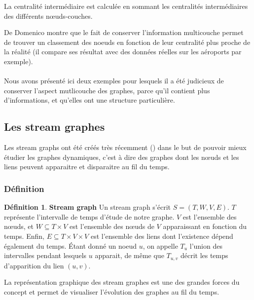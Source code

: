 \documentclass[11pt,a4paper]{article}
\theoremstyle{definition}
\newtheorem{defn}{Définition}
\theoremstyle{remark}
\theoremstyle{remark}
\begin{document}
La centralité intermédiaire est calculée en sommant les centralités intermédiaires des différents nœuds-couches.

De Domenico montre que le fait de conserver l'information multicouche permet de trouver un classement des noeuds en fonction de leur centralité plus proche de la réalité (il compare ses résultat avec des données réelles sur les aéroports par exemple).

\paragraph{}

Nous avons présenté ici deux exemples pour lesquels il a été judicieux de conserver l'aspect mutlicouche des graphes, parce qu'il contient plus d'informations, et qu'elles ont une structure particulière.


\subsection{Les stream graphes}



Les stream graphs ont été créés très récemment (\cite{stream}) dans le but de pouvoir mieux étudier les graphes dynamiques, c'est à dire des graphes dont les nœuds et les liens peuvent apparaitre et disparaitre au fil du temps.

\subsubsection{Définition}

\begin{defn}{\textbf{Stream graph}}
Un stream graph s'écrit $S=(T,W,V,E)$. $T$ représente l'intervalle de temps d'étude de notre graphe. $V$ est l'ensemble des nœuds, et $W \subseteq T \times V$ est l'ensemble des nœuds de $V$ apparaissant en fonction du temps. Enfin, $E \subseteq T \times V \times V$ est l'ensemble des liens dont l'existence dépend également du temps. Étant donné un noeud $u$, on appelle $T_u$ l'union des intervalles pendant lesquels $u$ apparait, de même que $T_{u,v}$ décrit les temps d'apparition du lien $(u,v)$.
\end{defn}

La représentation graphique des stream graphes est une des grandes forces du concept et permet de visualiser l'évolution des graphes au fil du temps.
\end{document}
